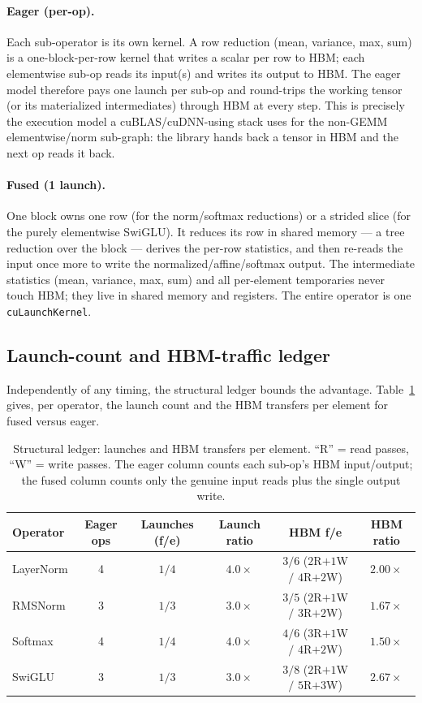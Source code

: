 \documentclass[11pt,a4paper]{article}
\begin{document}
\paragraph{Eager (per-op).} Each sub-operator is its own kernel. A row reduction
(mean, variance, max, sum) is a one-block-per-row kernel that writes a scalar
per row to HBM; each elementwise sub-op reads its input(s) and writes its output
to HBM. The eager model therefore pays one launch per sub-op and round-trips the
working tensor (or its materialized intermediates) through HBM at every step.
This is precisely the execution model a cuBLAS/cuDNN-using stack uses for the
non-GEMM elementwise/norm sub-graph: the library hands back a tensor in HBM and
the next op reads it back.

\paragraph{Fused (1 launch).} One block owns one row (for the norm/softmax
reductions) or a strided slice (for the purely elementwise SwiGLU). It reduces
its row in shared memory --- a tree reduction over the block --- derives the
per-row statistics, and then re-reads the input once more to write the
normalized/affine/softmax output. The intermediate statistics (mean, variance,
max, sum) and all per-element temporaries never touch HBM; they live in shared
memory and registers. The entire operator is one \texttt{cuLaunchKernel}.

\subsection{Launch-count and HBM-traffic ledger}

Independently of any timing, the structural ledger bounds the advantage.
Table~\ref{tab:ledger} gives, per operator, the launch count and the HBM
transfers per element for fused versus eager.

\begin{table}[t]
\centering
\caption{Structural ledger: launches and HBM transfers per element. ``R'' =
read passes, ``W'' = write passes. The eager column counts each sub-op's HBM
input/output; the fused column counts only the genuine input reads plus the
single output write.}
\label{tab:ledger}
\small
\begin{tabular}{lccccc}
\toprule
Operator & Eager ops & Launches (f/e) & Launch ratio & HBM f/e & HBM ratio \\
\midrule
LayerNorm & 4 & $1/4$ & $4.0\times$ & $3/6$ ($2$R$+1$W $/$ $4$R$+2$W) & $2.00\times$ \\
RMSNorm   & 3 & $1/3$ & $3.0\times$ & $3/5$ ($2$R$+1$W $/$ $3$R$+2$W) & $1.67\times$ \\
Softmax   & 4 & $1/4$ & $4.0\times$ & $4/6$ ($3$R$+1$W $/$ $4$R$+2$W) & $1.50\times$ \\
SwiGLU    & 3 & $1/3$ & $3.0\times$ & $3/8$ ($2$R$+1$W $/$ $5$R$+3$W) & $2.67\times$ \\
\bottomrule
\end{tabular}
\end{table}
\end{document}
